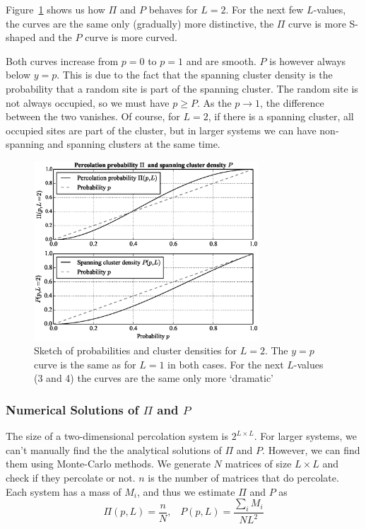 \documentclass[11pt]{article}
\numberwithin{equation}{section}
\numberwithin{figure}{section}
\begin{document}
Figure~\ref{fig:perc-small-L} shows us how $\Pi$ and $P$ behaves
for $L=2$. For the next few $L$-values, the curves are the same
only (gradually) more distinctive, the $\Pi$ curve is more S-shaped and
the $P$ curve is more curved.

Both curves increase from $p=0$ to $p=1$ and are smooth.
$P$ is however always below $y=p$. This is due to the fact that
the spanning cluster density is the probability that a random site
is part of the spanning cluster. The random site is not
always occupied, so we must have $p \geq P$. As the $p\rightarrow 1$,
the difference between the two vanishes.
Of course, for $L=2$, if there is a spanning cluster, all
occupied sites are part of the cluster, but in larger
systems we can have non-spanning and spanning clusters at the same time.

\begin{figure}[H]
    \centering
    \includegraphics[width=0.75\textwidth]{figures/percolation-figures/perc-small-L.eps}
    \caption{Sketch of probabilities and cluster densities
        for $L=2$. The $y=p$ curve is the same as for
        $L=1$ in both cases. 
        For the next $L$-values (3 and 4) the curves are the
        same only more `dramatic'}\label{fig:perc-small-L}
\end{figure}

\subsubsection{Numerical Solutions of $\Pi$ and $P$}
The size of a two-dimensional percolation system is $2^{L\times L}$.
For larger systems, we can't manually find the
the analytical solutions of $\Pi$ and $P$.
However, we can find them using Monte-Carlo methods.
We generate $N$ matrices of size $L\times L$ and
check if they percolate or not. $n$ is the number of
matrices that do percolate. Each system has a mass of $M_i$,
and thus we estimate $\Pi$ and $P$ as
\begin{equation}
    \Pi(p,L) = \frac{n}{N},\;\;\; P(p,L) = \frac{\sum_i M_i}{NL^2}
\end{equation}
\end{document}
